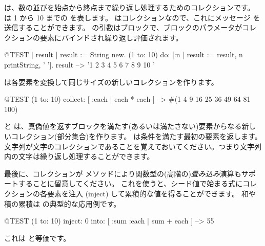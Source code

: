 \documentclass[a4paper,10pt,twoside]{book}
\begin{document}
 は、数の並びを始点から終点まで繰り返し処理するためのコレクションです。
は 1 から 10 までの  を表します。
 はコレクションなので、これにメッセージ  を送信することができます。
 の引数はブロックで、ブロックのパラメータがコレクションの要素にバインドされ繰り返し評価されます。

\begin{code}{@TEST | result |}
result := String new.
(1 to: 10) do: [:n | result := result, n printString, ' '].
result --> '1 2 3 4 5 6 7 8 9 10 '
\end{code}


 は各要素を変換して同じサイズの新しいコレクションを作ります。
\begin{code}{@TEST}
(1 to: 10) collect: [ :each | each * each ] --> #(1 4 9 16 25 36 49 64 81 100)
\end{code}

 と  は、真偽値を返すブロックを満たす(あるいは満たさない)要素からなる新しいコレクション(部分集合)を作ります。
 は条件を満たす最初の要素を返します。
文字列が文字のコレクションであることを覚えておいてください。つまり文字列内の文字は繰り返し処理することができます。


最後に、コレクションが  メソッドにより関数型の(高階の)\emph{畳み込み}演算もサポートすることに留意してください。
これを使うと、シード値で始まる式にコレクションの各要素を注入 (inject) して累積的な値を得ることができます。
和や積の累積は  の典型的な応用例です。

\begin{code}{@TEST}
(1 to: 10) inject: 0 into: [ :sum :each | sum + each ] --> 55
\end{code}

\noindent
これは と等価です。
\end{document}
